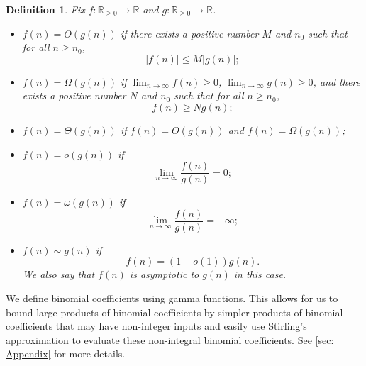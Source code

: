 \documentclass[11pt]{article}
\theoremstyle{plain}
\newtheorem{definition}[thm]{Definition}
\begin{document}
\begin{definition}
    Fix $f: \mathbb R_{\geq 0} \rightarrow \mathbb R$ and $g: \mathbb R_{\geq 0} \rightarrow \mathbb R$.
    \begin{itemize}
        \item $f(n) = O(g(n))$ if there exists a positive number $M$ and $n_0$ such that for all $n \geq n_0$, 
        $$|f(n)| \leq M|g(n)|;$$
        \item $f(n) = \Omega(g(n))$ if $\lim_{n \rightarrow \infty}f(n) \geq 0$, $\lim_{n \rightarrow \infty} g(n) \geq 0$, and there exists a positive number $N$ and $n_0$ such that for all $n\geq n_0$, 
        $$f(n) \geq Ng(n);$$
        \item $f(n) = \Theta(g(n))$ if $f(n) = O(g(n))$ and $f(n) = \Omega(g(n))$;
        \item $f(n) = o(g(n))$ if 
        $$\lim_{n \rightarrow \infty}\frac{f(n)}{g(n)} = 0;$$
        \item $f(n) = \omega(g(n))$ if 
        $$\lim_{n \rightarrow \infty} \frac{f(n)}{g(n)} = +\infty;$$
        \item $f(n) \sim g(n)$ if 
        $$f(n) = (1 + o(1))g(n).$$
        We also say that $f(n)$ is asymptotic to $g(n)$ in this case.
    \end{itemize}
\end{definition}


We define binomial coefficients using gamma functions. This allows for us to bound large products of binomial coefficients by simpler products of binomial coefficients that may have non-integer inputs and easily use Stirling's approximation to evaluate these non-integral binomial coefficients. See \cref{sec: Appendix} for more details.
\end{document}
